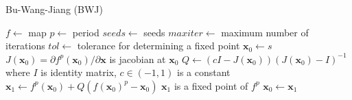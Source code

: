 \begin{algorithm}[!h]
    \caption{Bu-Wang-Jiang (BWJ)}
    \label{alg:bwj}
    \begin{algorithmic}[1]
        \Statex $f \gets$ map
        \Statex $p \gets$ period
        \Statex $seeds \gets$ seeds
        \Statex $maxiter \gets$ maximum number of iterations
        \Statex $tol \gets$ tolerance for determining a fixed point
            \State $\textbf{x}_{0} \gets s$
                \State $J(\textbf{x}_{0}) = \partial f^{p}(\textbf{x}_{0}) / \partial \textbf{x}$ is jacobian at $\textbf{x}_{0}$
                \State $Q \gets (cI-J(\textbf{x}_{0}))(J(\textbf{x}_{0})-I)^{-1}$ where $I$ is identity matrix, $c \in (-1, 1)$ is a constant 
                \State $\textbf{x}_1 \gets f^{p}(\textbf{x}_{0}) + Q(f(\textbf{x}_{0})^{p}-\textbf{x}_{0})$
                    \State $\textbf{x}_{1}$ is a fixed point of $f^{p}$
                \EndIf
                \State $\textbf{x}_{0} \gets \textbf{x}_{1}$
            \EndWhile
        \EndFor
    \end{algorithmic}
\end{algorithm}

